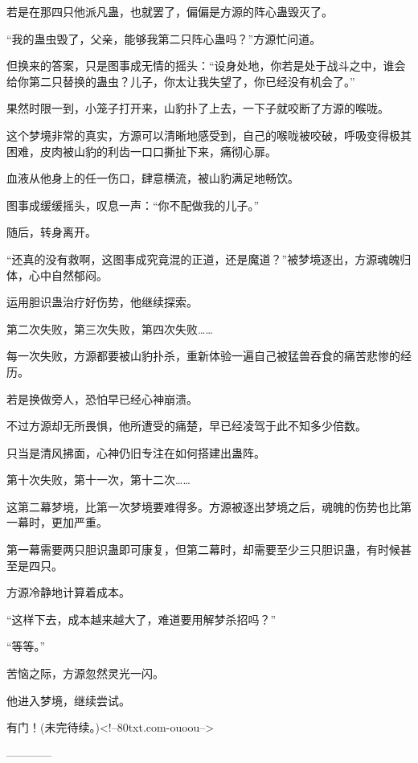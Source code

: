 \begin{this_body}
若是在那四只他派凡蛊，也就罢了，偏偏是方源的阵心蛊毁灭了。

“我的蛊虫毁了，父亲，能够我第二只阵心蛊吗？”方源忙问道。

但换来的答案，只是图事成无情的摇头：“设身处地，你若是处于战斗之中，谁会给你第二只替换的蛊虫？儿子，你太让我失望了，你已经没有机会了。”

果然时限一到，小笼子打开来，山豹扑了上去，一下子就咬断了方源的喉咙。

这个梦境非常的真实，方源可以清晰地感受到，自己的喉咙被咬破，呼吸变得极其困难，皮肉被山豹的利齿一口口撕扯下来，痛彻心扉。

血液从他身上的任一伤口，肆意横流，被山豹满足地畅饮。

图事成缓缓摇头，叹息一声：“你不配做我的儿子。”

随后，转身离开。

“还真的没有救啊，这图事成究竟混的正道，还是魔道？”被梦境逐出，方源魂魄归体，心中自然郁闷。

运用胆识蛊治疗好伤势，他继续探索。

第二次失败，第三次失败，第四次失败……

每一次失败，方源都要被山豹扑杀，重新体验一遍自己被猛兽吞食的痛苦悲惨的经历。

若是换做旁人，恐怕早已经心神崩溃。

不过方源却无所畏惧，他所遭受的痛楚，早已经凌驾于此不知多少倍数。

只当是清风拂面，心神仍旧专注在如何搭建出蛊阵。

第十次失败，第十一次，第十二次……

这第二幕梦境，比第一次梦境要难得多。方源被逐出梦境之后，魂魄的伤势也比第一幕时，更加严重。

第一幕需要两只胆识蛊即可康复，但第二幕时，却需要至少三只胆识蛊，有时候甚至是四只。

方源冷静地计算着成本。

“这样下去，成本越来越大了，难道要用解梦杀招吗？”

“等等。”

苦恼之际，方源忽然灵光一闪。

他进入梦境，继续尝试。

有门！(未完待续。)<!--80txt.com-ouoou-->

------------

\end{this_body}

